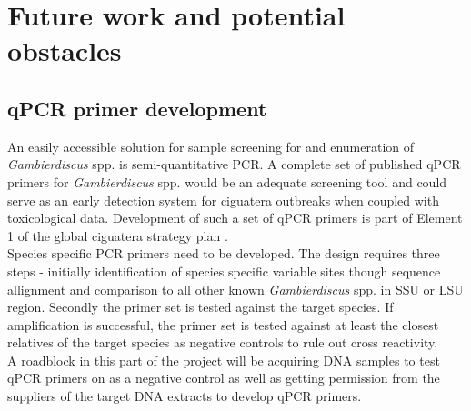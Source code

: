 \documentclass[12pt]{article}
\begin{document}





\section{Future work and potential obstacles}

\subsection{qPCR primer development}
An easily accessible solution for sample screening for and enumeration of \emph{Gambierdiscus} spp. is  semi-quantitative PCR. A complete set of published qPCR primers for \emph{Gambierdiscus} spp. would be an adequate screening tool and could serve as an early detection system for ciguatera outbreaks when coupled with toxicological data. Development of such a set of qPCR primers is part of Element 1 of the global ciguatera strategy plan \cite{globalcig}. \\
Species specific PCR primers need to be developed. The design requires three steps - initially identification of species specific variable sites though sequence allignment and comparison to all other known \emph{Gambierdiscus} spp. in SSU or LSU region. Secondly the primer set is tested against the target species. If amplification is successful, the primer set is tested against at least the closest relatives of the target species as negative controls to rule out cross reactivity. \\
A roadblock in this part of the project will be acquiring DNA samples to test qPCR primers on as a negative control as well as getting permission from the suppliers of the target DNA extracts to develop qPCR primers.
\end{document}
